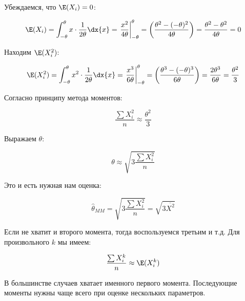 \documentclass[12pt, a4paper, oneside]{article}
\begin{document}
\begin{sol}
Убеждаемся, что $\E(X_{i})=0$:

\[  \E(X_{i}) = \int _{-\theta}^{\theta} x \cdot \frac{1}{2\theta} \dx{x} = \left. \frac{x^2}{4 \theta} \right|_{-\theta}^{\theta} = \left( \frac{\theta^2 - (-\theta)^2 }{4 \theta}  \right) =  \frac{\theta^{2} - \theta^{2}}{4 \theta} = 0  \]

Находим $ \E(X_{i}^{2}) $:

\[  \E(X_{i}^{2}) = \int _{-\theta}^{\theta} x^{2} \cdot \frac{1}{2\theta}  \dx{x} = \left. \frac{x^3}{6 \theta} \right|_{-\theta}^{\theta} = \left( \frac{\theta^3 - (-\theta)^3 }{6\theta}  \right) = \frac{2 \theta^{3}}{6\theta}  = \frac{\theta^{2}}{3}  \]

Согласно принципу метода моментов:

\[ \frac{\sum X_{i}^{2}}{n} \approx \frac{\theta^{2}}{3} \]

Выражаем $ \theta $:

\[ \theta\approx \sqrt{3\frac{\sum X_{i}^{2}}{n} }\]

Это и есть нужная нам оценка:

\[ \hat{\theta}_{MM}= \sqrt{3\frac{\sum X_{i}^{2}}{n} } = \sqrt{3 \overline{X^2 } }\]

Если не хватит и второго момента, тогда воспользуемся третьим и т.д. Для произвольного $k$ мы имеем:

\[ \frac{\sum X_{i}^{k}}{n} \approx \E(X_{i}^{k})\]

В большинстве случаев хватает именного первого момента. Последующие моменты нужны чаще всего при оценке нескольких параметров.
\end{sol}
\end{document}
